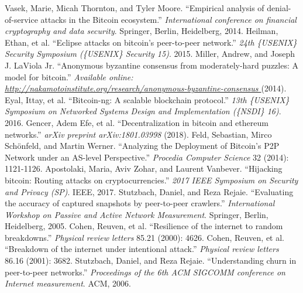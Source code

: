 \documentclass[10pt,conference,final]{IEEEtran}
\begin{document}
\begin{thebibliography}{99}
Vasek, Marie, Micah Thornton, and Tyler Moore. ``Empirical analysis of denial-of-service attacks in the Bitcoin ecosystem.'' \emph{International conference on financial cryptography and data security}. Springer, Berlin, Heidelberg, 2014.
Heilman, Ethan, et al. ``Eclipse attacks on bitcoin’s peer-to-peer network.'' \emph{24th \{USENIX\} Security Symposium (\{USENIX\} Security 15)}. 2015.
Miller, Andrew, and Joseph J. LaViola Jr. ``Anonymous byzantine consensus from moderately-hard puzzles: A model for bitcoin.'' \emph{Available online: \url{http://nakamotoinstitute.org/research/anonymous-byzantine-consensus }} (2014).
Eyal, Ittay, et al. ``Bitcoin-ng: A scalable blockchain protocol.'' \emph{13th \{USENIX\} Symposium on Networked Systems Design and Implementation (\{NSDI\} 16)}. 2016.
Gencer, Adem Efe, et al. ``Decentralization in bitcoin and ethereum networks.'' \emph{arXiv preprint arXiv:1801.03998} (2018).
Feld, Sebastian, Mirco Sch\"onfeld, and Martin Werner. ``Analyzing the Deployment of Bitcoin's P2P Network under an AS-level Perspective.'' \emph{Procedia Computer Science} 32 (2014): 1121-1126.
Apostolaki, Maria, Aviv Zohar, and Laurent Vanbever. ``Hijacking bitcoin: Routing attacks on cryptocurrencies.'' \emph{2017 IEEE Symposium on Security and Privacy (SP)}. IEEE, 2017.
Stutzbach, Daniel, and Reza Rejaie. ``Evaluating the accuracy of captured snapshots by peer-to-peer crawlers.'' \emph{International Workshop on Passive and Active Network Measurement}. Springer, Berlin, Heidelberg, 2005.
Cohen, Reuven, et al. ``Resilience of the internet to random breakdowns.'' \emph{Physical review letters} 85.21 (2000): 4626.
Cohen, Reuven, et al. ``Breakdown of the internet under intentional attack.'' \emph{Physical review letters} 86.16 (2001): 3682.
Stutzbach, Daniel, and Reza Rejaie. ``Understanding churn in peer-to-peer networks.'' \emph{Proceedings of the 6th ACM SIGCOMM conference on Internet measurement}. ACM, 2006.

\end{thebibliography}

\end{document}
